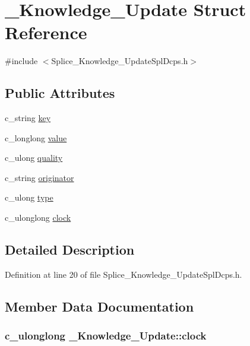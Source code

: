 \hypertarget{struct__Knowledge__Update}{
\section{\_\-Knowledge\_\-Update Struct Reference}
\label{dd/dc6/struct__Knowledge__Update}
}


{\ttfamily \#include $<$Splice\_\-Knowledge\_\-UpdateSplDcps.h$>$}

\subsection*{Public Attributes}
\begin{DoxyCompactItemize}
\item 
c\_\-string \hyperlink{struct__Knowledge__Update_ae6bf286683e3ce89204b2460bf77976d}{key}
\item 
c\_\-longlong \hyperlink{struct__Knowledge__Update_abdef46590ce83f06bbcb422af7bbc101}{value}
\item 
c\_\-ulong \hyperlink{struct__Knowledge__Update_a80ece4580d1d41f7128cd6f8831e8339}{quality}
\item 
c\_\-string \hyperlink{struct__Knowledge__Update_ac118c902b23ec349bb3cb9c08ac47f69}{originator}
\item 
c\_\-ulong \hyperlink{struct__Knowledge__Update_a2215adbfc2cec6b057f191ea4b2a961a}{type}
\item 
c\_\-ulonglong \hyperlink{struct__Knowledge__Update_a18dae6f32d6827e5fcf112ec4eb0d1a7}{clock}
\end{DoxyCompactItemize}


\subsection{Detailed Description}


Definition at line 20 of file Splice\_\-Knowledge\_\-UpdateSplDcps.h.



\subsection{Member Data Documentation}
\hypertarget{struct__Knowledge__Update_a18dae6f32d6827e5fcf112ec4eb0d1a7}{
\subsubsection[{clock}]{\setlength{\rightskip}{0pt plus 5cm}c\_\-ulonglong {\bf \_\-Knowledge\_\-Update::clock}}}
\label{dd/dc6/struct__Knowledge__Update_a18dae6f32d6827e5fcf112ec4eb0d1a7}


